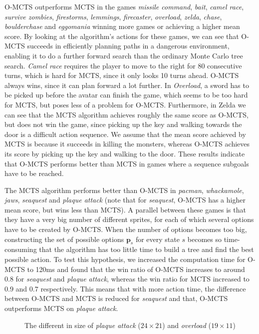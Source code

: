 O-MCTS outperforms MCTS in the games \textit{missile command}, \textit{bait},
\textit{camel race}, \textit{survive zombies}, \textit{firestorms},
\textit{lemmings}, \textit{firecaster}, \textit{overload}, \textit{zelda},
\textit{chase}, \textit{boulderchase} and \textit{eggomania} winning more games
or achieving a higher mean score. By looking at the algorithm's actions for
these games, we can see that O-MCTS succeeds in efficiently planning paths in a
dangerous environment, enabling it to do a further forward search than the
ordinary Monte Carlo tree search. \textit{Camel race} requires the player to
move to the right for 80 consecutive turns, which is hard for MCTS, since
it only looks 10 turns ahead. O-MCTS always wins, since it can plan forward a
lot further. In \textit{Overload}, a sword has to be picked up before the avatar
can finish the game, which seems to be too hard for MCTS, but poses less of a
problem for O-MCTS.  Furthermore, in Zelda we can see that the MCTS algorithm
achieves roughly the same score as O-MCTS, but does not win the game, since
picking up the key and walking towards the door is a difficult action sequence.
We assume that the mean score achieved by MCTS is because it succeeds in killing
the monsters, whereas O-MCTS achieves its score by picking up the key and
walking to the door.  These results indicate that O-MCTS performs better than
MCTS in games where a sequence subgoals have to be reached.

The MCTS algorithm performs better than O-MCTS in \textit{pacman},
\textit{whackamole}, \textit{jaws}, \textit{seaquest} and \textit{plaque attack}
(note that for \textit{seaquest}, O-MCTS has a higher mean score, but wins less
than MCTS). A parallel between these games is that they have a very
big number of different sprites, for each of which several options have to be
created by O-MCTS. When the number of options becomes too big, constructing the
set of possible options $\mathbf{p}_s$ for every state $s$ becomes so
time-consuming that the algorithm has too little time to build a tree and find
the best possible action. To test this hypothesis, we increased the computation
time for O-MCTS to 120ms and found that the win ratio of O-MCTS increases to
around $0.8$ for \textit{seaquest} and \textit{plaque attack}, whereas the win
ratio for MCTS increased to $0.9$ and $0.7$ respectively. This means that with
more action time, the difference between O-MCTS and MCTS is reduced for
\textit{seaquest} and that, O-MCTS outperforms MCTS on \textit{plaque attack}.

\begin{figure}
	\centering
	\caption{The different in size of \textit{plaque attack} ($24\times21$) and 
		\textit{overload} ($19\times11$)}
	\label{fig:game-size}
\end{figure}

